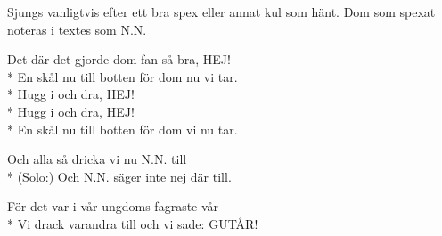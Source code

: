 \begin{SongText}
    \begin{SongInfo}
        Sjungs vanligtvis efter ett bra spex eller annat kul som hänt. Dom som spexat noteras i textes som N.N.
    \end{SongInfo}
    \begin{SongVerse}
        Det där det gjorde dom fan så bra, HEJ!\\*%
        En skål nu till botten för dom nu vi tar.\\*%
        Hugg i och dra, HEJ!\\*%
        Hugg i och dra, HEJ!\\*%
        En skål nu till botten för dom vi nu tar.
    \end{SongVerse}
    \begin{SongVerse}
        Och alla så dricka vi nu N.N. till\\*%
        (Solo:) Och N.N. säger inte nej där till.
    \end{SongVerse}
    \begin{SongVerse}
        För det var i vår ungdoms fagraste vår\\*%
        Vi drack varandra till och vi sade: GUTÅR! 
    \end{SongVerse}
\end{SongText}
